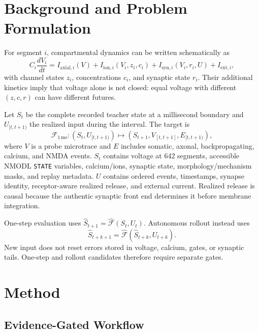 \documentclass[11pt]{article}
\begin{document}
\section{Background and Problem Formulation}

For segment $i$, compartmental dynamics can be written schematically as
\begin{equation}
 C_i\frac{dV_i}{dt}=I_{\mathrm{axial},i}(V)
 +I_{\mathrm{ion},i}(V_i,z_i,c_i)
 +I_{\mathrm{syn},i}(V_i,r_i,U)+I_{\mathrm{ext},i},
 \label{eq:cable}
\end{equation}
with channel states $z_i$, concentrations $c_i$, and synaptic state $r_i$.
Their additional kinetics imply that voltage alone is not closed: equal
voltage with different $(z,c,r)$ can have different futures.

Let $S_t$ be the complete recorded teacher state at a millisecond boundary and
$U_{[t,t+1)}$ the realized input during the interval. The target is
\begin{equation}
 \mathcal F_{1\,\mathrm{ms}}:(S_t,U_{[t,t+1)})\mapsto
 (S_{t+1},V_{[t,t+1]},E_{[t,t+1)}),
 \label{eq:flowmap}
\end{equation}
where $V$ is a probe microtrace and $E$ includes somatic, axonal,
backpropagating, calcium, and NMDA events. $S_t$ contains voltage at 642
segments, accessible NMODL \texttt{STATE} variables, calcium/ions, synaptic
state, morphology/mechanism masks, and replay metadata. $U$ contains ordered
events, timestamps, synapse identity, receptor-aware realized release, and
external current. Realized release is causal because the authentic synaptic
front end determines it before membrane integration.

One-step evaluation uses $\widehat S_{t+1}=\widehat{\mathcal F}(S_t,U_t)$.
Autonomous rollout instead uses
\begin{equation}
 \widehat S_{t+k+1}=\widehat{\mathcal F}(\widehat S_{t+k},U_{t+k}).
 \label{eq:rollout}
\end{equation}
New input does not reset errors stored in voltage, calcium, gates, or synaptic
tails. One-step and rollout candidates therefore require separate gates.

\section{Method}

\subsection{Evidence-Gated Workflow}
\end{document}
